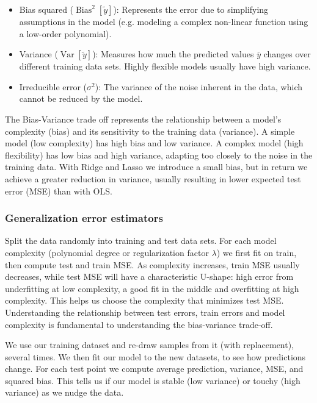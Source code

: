 \documentclass[amssymb,twocolumn,aps]{revtex4}
\begin{document}
\begin{itemize}
    \item Bias squared ($\operatorname{Bias}^2[\tilde y]$): Represents the error due to simplifying assumptions in the model (e.g. modeling a complex non-linear function using a low-order polynomial). 
    \item Variance ($\operatorname{Var}[\tilde y]$): Measures how much the predicted values $\overline{y}$ changes over different training data sets. Highly flexible models usually have high variance. 
    \item Irreducible error ($\sigma^2$): The variance of the noise inherent in the data, which cannot be reduced by the model. 
\end{itemize}

The Bias-Variance trade off represents the relationship between a model's complexity (bias) and its sensitivity to the training data (variance). 
A simple model (low complexity) has high bias and low variance. 
A complex model (high flexibility) has low bias and high variance, adapting too closely to the noise in the training data. With Ridge and Lasso we introduce a small bias, but in return we achieve a greater reduction in variance, usually resulting in lower expected test error (MSE) than with OLS. 

\subsubsection{Generalization error estimators}


Split the data randomly into training and test data sets. For each model complexity (polynomial degree or regularization factor $\lambda$) we first fit on train, then compute test and train MSE. As complexity increases, train MSE usually decreases, while test MSE will have a characteristic U-shape: high error from underfitting at low complexity, a good fit in the middle and overfitting at high complexity. This helps us choose the complexity that minimizes test MSE. Understanding the relationship between test errors, train errors and model complexity is fundamental to understanding the bias-variance trade-off. 


We use our training dataset and re-draw samples from it (with replacement), several times. We then fit our model to the new datasets, to see how predictions change. For each test point we compute average prediction, variance, MSE, and squared bias. This tells us if our model is stable (low variance) or touchy (high variance) as we nudge the data. 
\end{document}
